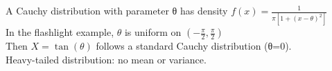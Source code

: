 \documentclass[preview]{standalone}
\begin{document}
A Cauchy distribution with parameter θ has density $f(x)=\frac{1}{\pi[1+(x-\theta)^2]}$\\In the flashlight example, $\theta$ is uniform on $(-\frac{\pi}{2}, \frac{\pi}{2})$\\Then $X = \tan(\theta)$ follows a standard Cauchy distribution (θ=0).\\Heavy-tailed distribution: no mean or variance.\\
\end{document}
